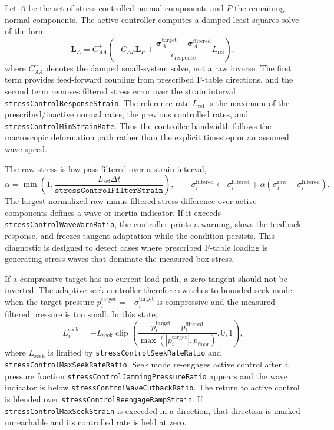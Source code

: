 Let $A$ be the set of stress-controlled normal components and $P$ the remaining
normal components.  The active controller computes a damped least-squares solve
of the form
\begin{equation}
  \mathbf{L}_A = C_{AA}^{+}\left(
    -C_{AP}\mathbf{L}_P
    + \frac{\boldsymbol{\sigma}^{\mathrm{target}}_A-
             \boldsymbol{\sigma}^{\mathrm{filtered}}_A}
           {\epsilon_{\mathrm{response}}}
      L_{\mathrm{ref}}
  \right),
  \label{eq:bc-adaptive-seek-active-law}
\end{equation}
where $C_{AA}^{+}$ denotes the damped small-system solve, not a raw inverse.
The first term provides feed-forward coupling from prescribed F-table
directions, and the second term removes filtered stress error over the strain
interval \texttt{stressControlResponseStrain}.  The reference rate
$L_{\mathrm{ref}}$ is the maximum of the prescribed/inactive normal rates, the
previous controlled rates, and \texttt{stressControlMinStrainRate}.  Thus the
controller bandwidth follows the macroscopic deformation path rather than the
explicit timestep or an assumed wave speed.

The raw stress is low-pass filtered over a strain interval,
\begin{equation}
  \alpha = \min\left(1,
    \frac{L_{\mathrm{ref}}\Delta t}{\texttt{stressControlFilterStrain}}
  \right),
  \qquad
  \sigma_i^{\mathrm{filtered}} \leftarrow
  \sigma_i^{\mathrm{filtered}} +
  \alpha(\sigma_i^{\mathrm{raw}}-\sigma_i^{\mathrm{filtered}}).
  \label{eq:bc-adaptive-seek-filter}
\end{equation}
The largest normalized raw-minus-filtered stress difference over active
components defines a wave or inertia indicator.  If it exceeds
\texttt{stressControlWaveWarnRatio}, the controller prints a warning, slows the
feedback response, and freezes tangent adaptation while the condition persists.
This diagnostic is designed to detect cases where prescribed F-table loading is
generating stress waves that dominate the measured box stress.

If a compressive target has no current load path, a zero tangent should not be
inverted.  The adaptive-seek controller therefore switches to bounded seek mode
when the target pressure $p_i^{\mathrm{target}}=-\sigma_i^{\mathrm{target}}$ is
compressive and the measured filtered pressure is too small.  In this state,
\begin{equation}
  L_i^{\mathrm{seek}} =
  -L_{\mathrm{seek}}
  \operatorname{clip}\left(
    \frac{p_i^{\mathrm{target}}-p_i^{\mathrm{filtered}}}
         {\max(|p_i^{\mathrm{target}}|,p_{\mathrm{floor}})},0,1
  \right),
  \label{eq:bc-adaptive-seek-seek-law}
\end{equation}
where $L_{\mathrm{seek}}$ is limited by \texttt{stressControlSeekRateRatio} and
\texttt{stressControlMaxSeekRateRatio}.  Seek mode re-engages active control
after a pressure fraction \texttt{stressControlJammingPressureRatio} appears and
the wave indicator is below \texttt{stressControlWaveCutbackRatio}.  The return
to active control is blended over \texttt{stressControlReengageRampStrain}.  If
\texttt{stressControlMaxSeekStrain} is exceeded in a direction, that direction is
marked unreachable and its controlled rate is held at zero.

